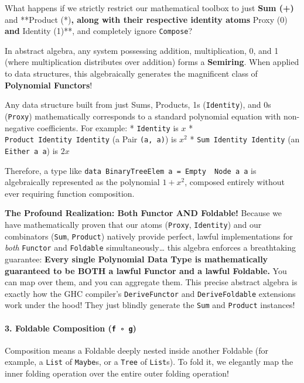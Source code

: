 \documentclass[
]{article}
\begin{document}
What happens if we strictly restrict our mathematical toolbox to just
\textbf{Sum (+)} and **Product (*)\textbf{, along with their respective
identity atoms }Proxy (0)\textbf{ and }Identity (1)**, and completely
ignore \texttt{Compose}?

In abstract algebra, any system possessing addition, multiplication, 0,
and 1 (where multiplication distributes over addition) forms a
\textbf{Semiring}. When applied to data structures, this algebraically
generates the magnificent class of \textbf{Polynomial Functors}!

Any data structure built from just Sums, Products, 1s
(\texttt{Identity}), and 0s (\texttt{Proxy}) mathematically corresponds
to a standard polynomial equation with non-negative coefficients. For
example: * \texttt{Identity} is \(x\) *
\texttt{Product\ Identity\ Identity} (a Pair \texttt{(a,\ a)}) is
\(x^2\) * \texttt{Sum\ Identity\ Identity} (an \texttt{Either\ a\ a}) is
\(2x\)

Therefore, a type like
\texttt{data\ BinaryTreeElem\ a\ =\ Empty\ \textbar{}\ Node\ a\ a} is
algebraically represented as the polynomial \(1 + x^2\), composed
entirely without ever requiring function composition.

\textbf{The Profound Realization: Both Functor AND Foldable!} Because we
have mathematically proven that our atoms (\texttt{Proxy},
\texttt{Identity}) and our combinators (\texttt{Sum}, \texttt{Product})
natively provide perfect, lawful implementations for \emph{both}
\texttt{Functor} and \texttt{Foldable} simultaneously\ldots{} this
algebra enforces a breathtaking guarantee: \textbf{Every single
Polynomial Data Type is mathematically guaranteed to be BOTH a lawful
Functor and a lawful Foldable.} You can map over them, and you can
aggregate them. This precise abstract algebra is exactly how the GHC
compiler's \texttt{DeriveFunctor} and \texttt{DeriveFoldable} extensions
work under the hood! They just blindly generate the \texttt{Sum} and
\texttt{Product} instances!

\paragraph{\texorpdfstring{3. Foldable Composition
(\texttt{f\ ∘\ g})}{3. Foldable Composition (f ∘ g)}}\label{foldable-composition-f-g}

Composition means a Foldable deeply nested inside another Foldable (for
example, a \texttt{List} of \texttt{Maybe}s, or a \texttt{Tree} of
\texttt{List}s). To fold it, we elegantly map the inner folding
operation over the entire outer folding operation!
\end{document}
